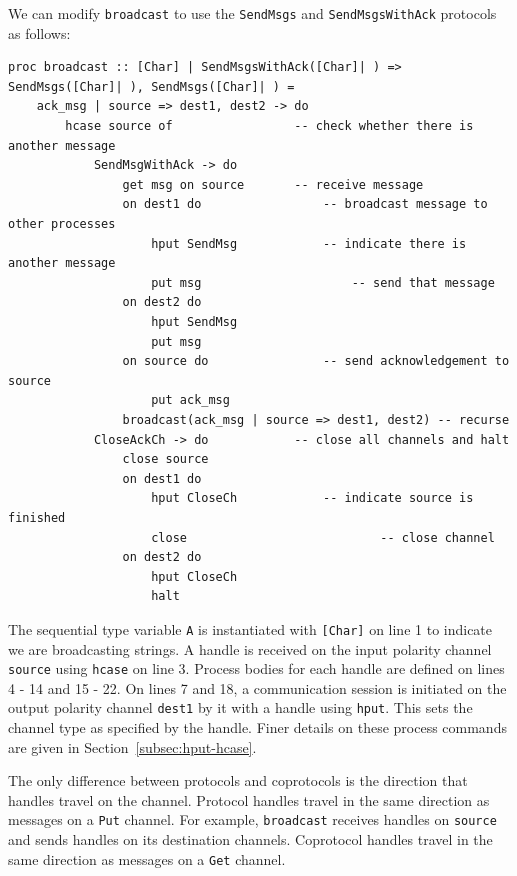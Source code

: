 \documentclass[11pt]{article}
\begin{document}
We can modify \lstinline$broadcast$ to use the \lstinline$SendMsgs$ and \lstinline$SendMsgsWithAck$ protocols as follows:
\begin{lstlisting}[label=ex:recbroadcast, caption=Process that broadcasts messages from a single source]
proc broadcast :: [Char] | SendMsgsWithAck([Char]| ) => SendMsgs([Char]| ), SendMsgs([Char]| ) = 
	ack_msg | source => dest1, dest2 -> do
		hcase source of					-- check whether there is another message
			SendMsgWithAck -> do
				get msg on source		-- receive message
				on dest1 do					-- broadcast message to other processes
					hput SendMsg			-- indicate there is another message
					put msg						-- send that message
				on dest2 do
					hput SendMsg
					put msg
				on source do				-- send acknowledgement to source
					put ack_msg
				broadcast(ack_msg | source => dest1, dest2) -- recurse
			CloseAckCh -> do			-- close all channels and halt
				close source							
				on dest1 do						
					hput CloseCh			-- indicate source is finished
					close							-- close channel
				on dest2 do
					hput CloseCh	
					halt	
\end{lstlisting}
The sequential type variable \lstinline$A$ is instantiated with \lstinline$[Char]$ on line 1 to indicate we are broadcasting strings.
A handle is received on the input polarity channel \lstinline$source$ using \lstinline$hcase$ on line 3.
Process bodies for each handle are defined on lines 4 - 14 and 15 - 22.
On lines 7 and 18, a communication session is initiated on the output polarity channel \lstinline$dest1$ by  it with a handle using \lstinline$hput$.
This sets the channel type as specified by the handle. 
Finer details on these process commands are given in Section~\ref{subsec:hput-hcase}.

The only difference between protocols and coprotocols is the direction that handles travel on the channel.
Protocol handles travel in the same direction as messages on a \lstinline$Put$ channel.
For example, \lstinline$broadcast$ receives handles on \lstinline$source$ and sends handles on its destination channels.
Coprotocol handles travel in the same direction as messages on a \lstinline$Get$ channel.
\end{document}
